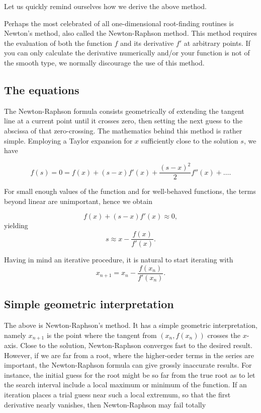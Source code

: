 \documentclass[%
oneside,                 %
final,                   %
10pt]{article}
\begin{document}
Let us quickly remind ourselves how we derive the above method.

Perhaps the most celebrated of all one-dimensional root-finding
routines is Newton's method, also called the Newton-Raphson
method. This method  requires the evaluation of both the
function $f$ and its derivative $f'$ at arbitrary points. 
If you can only calculate the derivative
numerically and/or your function is not of the smooth type, we
normally discourage the use of this method.

\subsection{The equations}

The Newton-Raphson formula consists geometrically of extending the
tangent line at a current point until it crosses zero, then setting
the next guess to the abscissa of that zero-crossing.  The mathematics
behind this method is rather simple. Employing a Taylor expansion for
$x$ sufficiently close to the solution $s$, we have


\[
    f(s)=0=f(x)+(s-x)f'(x)+\frac{(s-x)^2}{2}f''(x) +\dots.
    \label{eq:taylornr}
\]

For small enough values of the function and for well-behaved
functions, the terms beyond linear are unimportant, hence we obtain


\[
   f(x)+(s-x)f'(x)\approx 0,
\]
yielding
\[
   s\approx x-\frac{f(x)}{f'(x)}.
\]

Having in mind an iterative procedure, it is natural to start iterating with
\[
   x_{n+1}=x_n-\frac{f(x_n)}{f'(x_n)}.
\]

\subsection{Simple geometric interpretation}

The above is Newton-Raphson's method. It has a simple geometric
interpretation, namely $x_{n+1}$ is the point where the tangent from
$(x_n,f(x_n))$ crosses the $x$-axis.  Close to the solution,
Newton-Raphson converges fast to the desired result. However, if we
are far from a root, where the higher-order terms in the series are
important, the Newton-Raphson formula can give grossly inaccurate
results. For instance, the initial guess for the root might be so far
from the true root as to let the search interval include a local
maximum or minimum of the function.  If an iteration places a trial
guess near such a local extremum, so that the first derivative nearly
vanishes, then Newton-Raphson may fail totally
\end{document}
